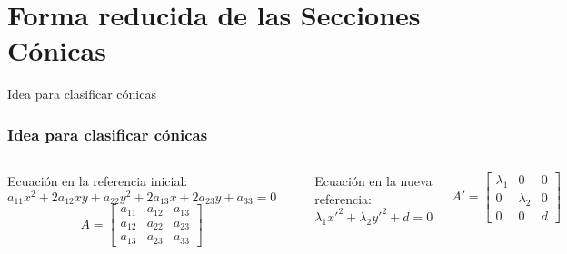 \documentclass[xcolor={dvipsnames},aspectratio=169,10pt]{beamer}
\begin{document}
\section{Forma reducida de las Secciones Cónicas}
\begin{frame}{Idea para clasificar cónicas}
  \frametitle{Idea para clasificar cónicas}
  
  \begin{columns}
    Ecuación en la referencia inicial:
    \begin{equation*}
      a_{11}x^2 + 2a_{12}xy + a_{22}y^2 + 2a_{13}x + 2a_{23}y + a_{33} = 0
    \end{equation*}
    \begin{equation*}
      A = \begin{bmatrix}
        a_{11} & a_{12} & a_{13} \\
        a_{12} & a_{22} & a_{23} \\
        a_{13} & a_{23} & a_{33}
      \end{bmatrix}
    \end{equation*}

    \begin{center}
    \end{center}

    Ecuación en la nueva referencia:
    \begin{equation*}
      \lambda_1x'^2 + \lambda_2y'^2 + d= 0
    \end{equation*}

    \begin{equation*}
      A' = \begin{bmatrix}
        \lambda_1 & 0 & 0 \\
        0 & \lambda_2 & 0 \\
        0 & 0 & d
      \end{bmatrix}
    \end{equation*}
  \end{columns}
\end{frame}
\end{document}
